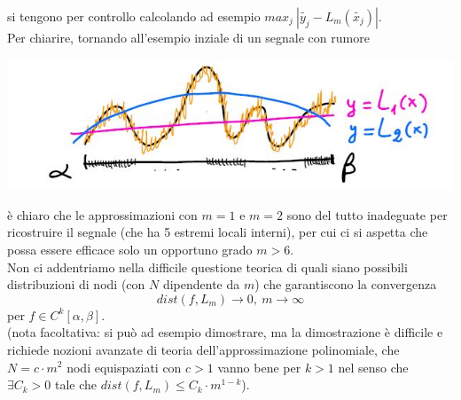 \documentclass[12pt,a4paper]{article}
\begin{document}
si tengono per controllo calcolando ad esempio $max_j\  |\tilde{y_j}-L_m(\tilde{x_j})|$.\\Per chiarire, tornando all'esempio inziale di un segnale con rumore
\begin{center}
    \includegraphics[scale=0.7]{calcolo32.JPG}
\end{center}
è chiaro che le approssimazioni con $m=1$ e $m=2$ sono del tutto inadeguate per ricostruire il segnale (che ha 5 estremi locali interni), per cui ci si aspetta che possa essere efficace solo un opportuno grado $m>6$.\\
Non ci addentriamo nella difficile questione teorica di quali siano possibili distribuzioni di nodi (con $N$ dipendente da $m$) che garantiscono la convergenza 
\[
dist(f, L_m) \to 0, \ m \to \infty
\]
per $f \in C^k[\alpha, \beta]$.\\
(nota facoltativa: si può ad esempio dimostrare, ma la dimostrazione è difficile e richiede nozioni avanzate di teoria dell'approssimazione polinomiale, che $N = c \cdot m^2$ nodi equispaziati con $c>1$ vanno bene per $k>1$ nel senso che $\exists C_k > 0$ tale che $dist(f,L_m) \leq C_k \cdot m^{1-k}$).
\end{document}
